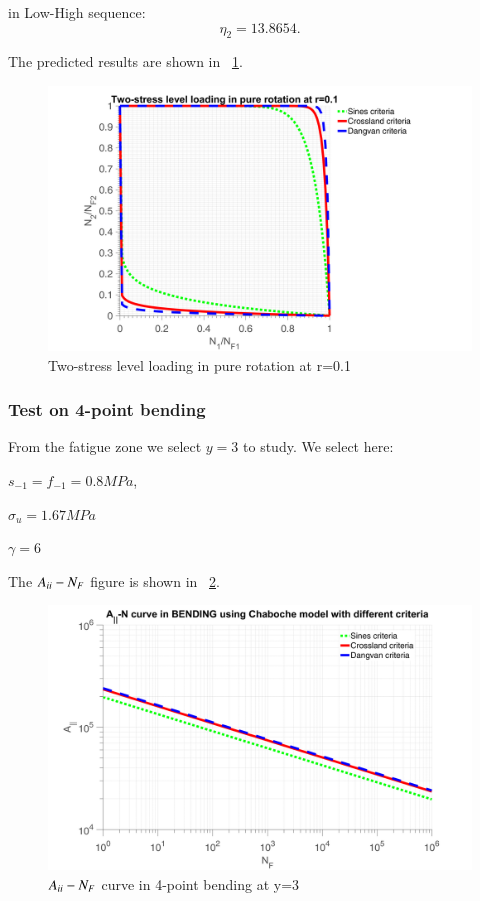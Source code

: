 \documentclass[3p,times,procedia,number]{elsarticle}
\newcommand{\figref}[1]{\figurename~\ref{#1}}
\begin{document}
in Low-High sequence:
$$\eta_2=13.8654.$$

The predicted results are shown in \figref{2stressR}.

\begin{figure}[h!]
	\centering
	\includegraphics[width=\textwidth]{figures//2stressR.png} 
	\caption{Two-stress level loading in pure rotation at r=0.1}
	\label{2stressR}
\end{figure}

\newpage
\subsubsection{Test on 4-point bending}
From the fatigue zone we select $y=3$ to study. We select here:

$s_{-1}=f_{-1}=0.8MPa$,

$\sigma_{u}=1.67MPa$ 

$\gamma=6$

The $A_{\uppercase\expandafter{\romannumeral2}}-N_F$ figure is shown in \figref{JNbending}.
\begin{figure}[h!]
	\centering
	\includegraphics[width=\textwidth]{figures//JNbending.png} 
	\caption{$A_{\uppercase\expandafter{\romannumeral2}}-N_F$ curve in 4-point bending at y=3}
	\label{JNbending}
\end{figure}
\end{document}
